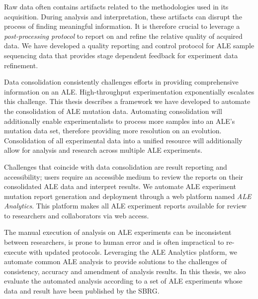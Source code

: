 \documentclass[12pt,final,masters,chapterheads]{ucsd}  %
\begin{document}
Raw data often contains artifacts related to the methodologies used in its acquisition. During analysis and interpretation, these artifacts can disrupt the process of finding meaningful information. It is therefore crucial to leverage a \textit{post-processing protocol} to report on and refine the relative quality of acquired data. We have developed a quality reporting and control protocol for ALE sample sequencing data that provides stage dependent feedback for experiment data refinement.

Data consolidation consistently challenges efforts in providing comprehensive information on an ALE. High-throughput experimentation exponentially escalates this challenge. This thesis describes a framework we have developed to automate the consolidation of ALE mutation data. Automating consolidation will additionally enable experimentalists to process more samples into an ALE's mutation data set, therefore providing more resolution on an evolution. Consolidation of all experimental data into a unified resource will additionally allow for analysis and research across multiple ALE experiments.

Challenges that coincide with data consolidation are result reporting and accessibility; users require an accessible medium to review the reports on their consolidated ALE data and interpret results. We automate ALE experiment mutation report generation and deployment through a web platform named \textit{ALE Analytics}. This platform makes all ALE experiment reports available for review to researchers and collaborators via web access.

The manual execution of analysis on ALE experiments can be inconsistent between researchers, is prone to human error and is often impractical to re-execute with updated protocols. Leveraging the ALE Analytics platform, we automate common ALE analysis to provide solutions to the challenges of consistency, accuracy and amendment of analysis results. In this thesis, we also evaluate the automated analysis according to a set of ALE experiments whose data and result have been published by the SBRG.
\end{document}
